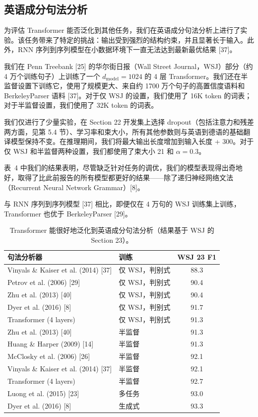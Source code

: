\documentclass[11pt,UTF8,fontset=fandol]{ctexart}
\newcommand{\dmodel}{d_{\mathrm{model}}}
\begin{document}
\subsection{英语成分句法分析}

为评估 Transformer 能否泛化到其他任务，我们在英语成分句法分析上进行了实验。该任务带来了特定的挑战：输出受到强烈的结构约束，并且显著长于输入。此外，RNN 序列到序列模型在小数据环境下一直无法达到最新最优结果 [37]。

我们在 Penn Treebank [25] 的华尔街日报（Wall Street Journal，WSJ）部分（约 4 万个训练句子）上训练了一个 $\dmodel = 1024$ 的 4 层 Transformer。我们还在半监督设置下训练它，使用了规模更大、来自约 1700 万个句子的高置信度语料和 BerkeleyParser 语料 [37]。对于仅 WSJ 的设置，我们使用了 16K token 的词表；对于半监督设置，我们使用了 32K token 的词表。

我们仅进行了少量实验，在 Section 22 开发集上选择 dropout（包括注意力和残差两方面，见第 5.4 节）、学习率和束大小，所有其他参数则与英语到德语的基础翻译模型保持不变。在推理期间，我们将最大输出长度增加到输入长度 + 300。对于仅 WSJ 和半监督两种设置，我们都使用了束大小 21 和 $\alpha = 0.3$。

表~4 中我们的结果表明，尽管缺乏针对任务的调优，我们的模型表现得出奇地好，取得了比此前报告的所有模型都更好的结果——除了递归神经网络文法（Recurrent Neural Network Grammar）[8]。

与 RNN 序列到序列模型 [37] 相比，即便仅在 4 万句的 WSJ 训练集上训练，Transformer 也优于 BerkeleyParser [29]。

\begin{table}[H]\centering
\caption{Transformer 能很好地泛化到英语成分句法分析（结果基于 WSJ 的 Section 23）。}
\label{tab:4}
\begin{tabular}{llc}
\toprule
句法分析器 & 训练 & WSJ 23 F1 \\
\midrule
Vinyals \& Kaiser et al. (2014) [37] & 仅 WSJ，判别式 & 88.3 \\
Petrov et al. (2006) [29] & 仅 WSJ，判别式 & 90.4 \\
Zhu et al. (2013) [40] & 仅 WSJ，判别式 & 90.4 \\
Dyer et al. (2016) [8] & 仅 WSJ，判别式 & 91.7 \\
Transformer (4 layers) & 仅 WSJ，判别式 & 91.3 \\
\midrule
Zhu et al. (2013) [40] & 半监督 & 91.3 \\
Huang \& Harper (2009) [14] & 半监督 & 91.3 \\
McClosky et al. (2006) [26] & 半监督 & 92.1 \\
Vinyals \& Kaiser et al. (2014) [37] & 半监督 & 92.1 \\
Transformer (4 layers) & 半监督 & 92.7 \\
\midrule
Luong et al. (2015) [23] & 多任务 & 93.0 \\
Dyer et al. (2016) [8] & 生成式 & 93.3 \\
\bottomrule
\end{tabular}
\end{table}
\end{document}
